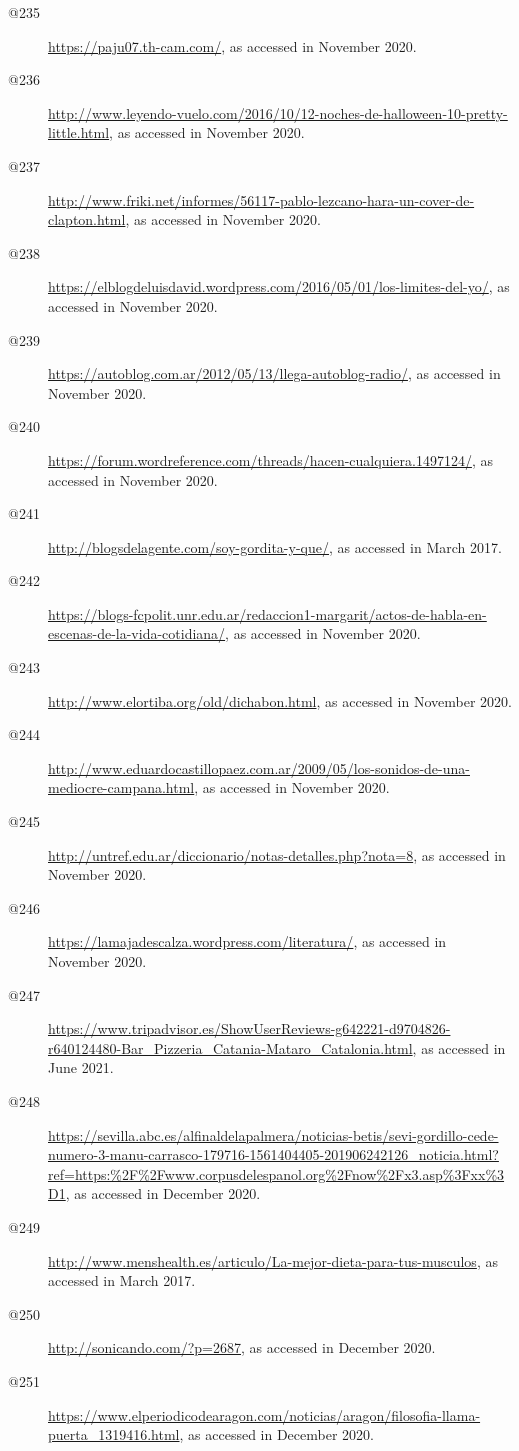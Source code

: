 \begin{flushleft}
\begin{description}
\item[@235]\url{https://paju07.th-cam.com/}, as accessed in November 2020.
\item[@236]\url{http://www.leyendo-vuelo.com/2016/10/12-noches-de-halloween-10-pretty-little.html}, as accessed in November 2020.
\item[@237]\url{http://www.friki.net/informes/56117-pablo-lezcano-hara-un-cover-de-clapton.html}, as accessed in November 2020.
\item[@238]\url{https://elblogdeluisdavid.wordpress.com/2016/05/01/los-limites-del-yo/}, as accessed in November 2020.
\item[@239]\url{https://autoblog.com.ar/2012/05/13/llega-autoblog-radio/}, as accessed in November 2020.
\item[@240]\url{https://forum.wordreference.com/threads/hacen-cualquiera.1497124/}, as accessed in November 2020.
\item[@241]\url{http://blogsdelagente.com/soy-gordita-y-que/}, as accessed in March 2017.
\item[@242]\url{https://blogs-fcpolit.unr.edu.ar/redaccion1-margarit/actos-de-habla-en-escenas-de-la-vida-cotidiana/}, as accessed in November 2020.
\item[@243]\url{http://www.elortiba.org/old/dichabon.html}, as accessed in November 2020.
\item[@244]\url{http://www.eduardocastillopaez.com.ar/2009/05/los-sonidos-de-una-mediocre-campana.html}, as accessed in November 2020.
\item[@245]\url{http://untref.edu.ar/diccionario/notas-detalles.php?nota=8}, as accessed in November 2020.
\item[@246]\url{https://lamajadescalza.wordpress.com/literatura/}, as accessed in November 2020.
\item[@247]\url{https://www.tripadvisor.es/ShowUserReviews-g642221-d9704826-r640124480-Bar_Pizzeria_Catania-Mataro_Catalonia.html}, as accessed in June 2021.
\item[@248]\url{https://sevilla.abc.es/alfinaldelapalmera/noticias-betis/sevi-gordillo-cede-numero-3-manu-carrasco-179716-1561404405-201906242126_noticia.html?ref=https:\%2F\%2Fwww.corpusdelespanol.org\%2Fnow\%2Fx3.asp\%3Fxx\%3D1}, as accessed in December 2020.
\item[@249]\url{http://www.menshealth.es/articulo/La-mejor-dieta-para-tus-musculos}, as accessed in March 2017.
\item[@250]\url{http://sonicando.com/?p=2687}, as accessed in December 2020.
\item[@251]\url{https://www.elperiodicodearagon.com/noticias/aragon/filosofia-llama-puerta_1319416.html}, as accessed in December 2020.

\end{description}
\end{flushleft}
